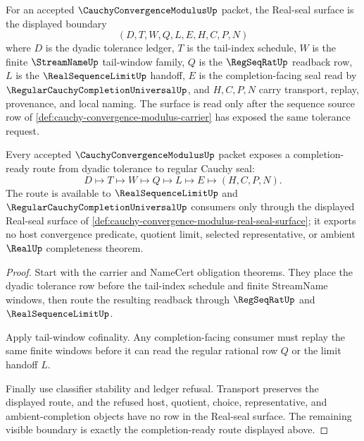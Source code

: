 \begin{definition}
\label{def:cauchy-convergence-modulus-real-seal-surface}
For an accepted $\CauchyConvergenceModulusUp$ packet, the Real-seal surface is the displayed boundary
$$
(D,T,W,Q,L,E,H,C,P,N)
$$
where $D$ is the dyadic tolerance ledger, $T$ is the tail-index schedule, $W$ is the finite $\StreamNameUp$ tail-window family, $Q$ is the $\RegSeqRatUp$ readback row, $L$ is the $\RealSequenceLimitUp$ handoff, $E$ is the completion-facing seal read by $\RegularCauchyCompletionUniversalUp$, and $H,C,P,N$ carry transport, replay, provenance, and local naming. The surface is read only after the sequence source row of \autoref{def:cauchy-convergence-modulus-carrier} has exposed the same tolerance request.
\end{definition}

\begin{theorem}
\label{thm:cauchy-convergence-modulus-completion-readiness}
Every accepted $\CauchyConvergenceModulusUp$ packet exposes a completion-ready route from dyadic tolerance to regular Cauchy seal:
$$
D\longmapsto T\longmapsto W\longmapsto Q\longmapsto L\longmapsto E\longmapsto(H,C,P,N).
$$
The route is available to $\RealSequenceLimitUp$ and $\RegularCauchyCompletionUniversalUp$ consumers only through the displayed Real-seal surface of \autoref{def:cauchy-convergence-modulus-real-seal-surface}; it exports no host convergence predicate, quotient limit, selected representative, or ambient $\RealUp$ completeness theorem.
\end{theorem}
\begin{proof}
Start with the carrier and NameCert obligation theorems. They place the dyadic tolerance row before the tail-index schedule and finite StreamName windows, then route the resulting readback through $\RegSeqRatUp$ and $\RealSequenceLimitUp$.

Apply tail-window cofinality. Any completion-facing consumer must replay the same finite windows before it can read the regular rational row $Q$ or the limit handoff $L$.

Finally use classifier stability and ledger refusal. Transport preserves the displayed route, and the refused host, quotient, choice, representative, and ambient-completion objects have no row in the Real-seal surface. The remaining visible boundary is exactly the completion-ready route displayed above.
\end{proof}

